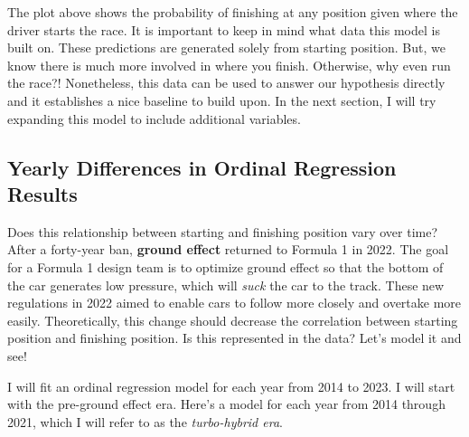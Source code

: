 \documentclass[
]{book}
\begin{document}
The plot above shows the probability of finishing at any position given where the driver starts the race. It is important to keep in mind what data this model is built on. These predictions are generated solely from starting position. But, we know there is much more involved in where you finish. Otherwise, why even run the race?! Nonetheless, this data can be used to answer our hypothesis directly and it establishes a nice baseline to build upon. In the next section, I will try expanding this model to include additional variables.

\hypertarget{yearly-differences-in-ordinal-regression-results}{%
\subsection{Yearly Differences in Ordinal Regression Results}\label{yearly-differences-in-ordinal-regression-results}}

Does this relationship between starting and finishing position vary over time? After a forty-year ban, \textbf{ground effect} returned to Formula 1 in 2022. The goal for a Formula 1 design team is to optimize ground effect so that the bottom of the car generates low pressure, which will \emph{suck} the car to the track. These new regulations in 2022 aimed to enable cars to follow more closely and overtake more easily. Theoretically, this change should decrease the correlation between starting position and finishing position. Is this represented in the data? Let's model it and see!

I will fit an ordinal regression model for each year from 2014 to 2023. I will start with the pre-ground effect era. Here's a model for each year from 2014 through 2021, which I will refer to as the \emph{turbo-hybrid era}.
\end{document}
